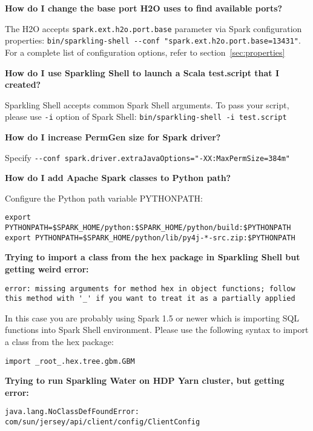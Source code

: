 \textbf{How do I change the base port H2O uses to find available ports?}

The H2O accepts \texttt{spark.ext.h2o.port.base} parameter via Spark configuration properties: {\lstinline[style=Bash]|bin/sparkling-shell --conf "spark.ext.h2o.port.base=13431"|}. For a complete list of configuration options, refer to section~\ref{sec:properties}

\textbf{How do I use Sparkling Shell to launch a Scala test.script that I created?}

Sparkling Shell accepts common Spark Shell arguments. To pass your script, please use \texttt{-i} option of Spark Shell: {\lstinline[style=Bash]|bin/sparkling-shell -i test.script|}

\textbf{How do I increase PermGen size for Spark driver?}

Specify {\lstinline[style=Bash]|--conf spark.driver.extraJavaOptions="-XX:MaxPermSize=384m"|}

\textbf{How do I add Apache Spark classes to Python path?}

Configure the Python path variable PYTHONPATH:
        
\begin{lstlisting}[style=Bash]
export PYTHONPATH=$SPARK_HOME/python:$SPARK_HOME/python/build:$PYTHONPATH
export PYTHONPATH=$SPARK_HOME/python/lib/py4j-*-src.zip:$PYTHONPATH
\end{lstlisting}

\textbf{Trying to import a class from the hex package in Sparkling Shell but getting weird error:}

\begin{lstlisting}[style=Scala]
error: missing arguments for method hex in object functions; follow this method with '_' if you want to treat it as a partially applied
\end{lstlisting}

In this case you are probably using Spark 1.5 or newer which is importing SQL functions into Spark Shell environment. Please use the following syntax to import a class from the hex package:
\begin{lstlisting}[style=Scala]
import _root_.hex.tree.gbm.GBM
\end{lstlisting}


\textbf{Trying to run Sparkling Water on HDP Yarn cluster, but getting error:}

\begin{lstlisting}[style=Scala]
java.lang.NoClassDefFoundError: com/sun/jersey/api/client/config/ClientConfig
\end{lstlisting}

